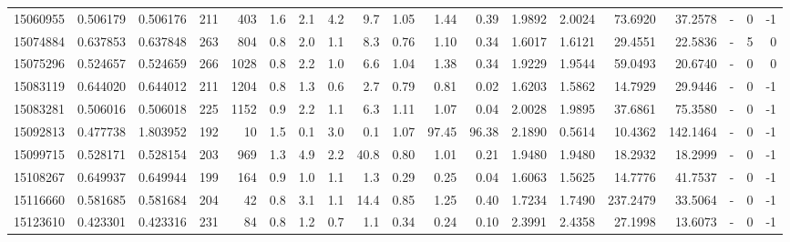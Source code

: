 \begin{tabular}{rrrrrrrrrrrrrrrrlrr}
  15060955 & 0.506179 &   0.506176 &  211 &  403 &      1.6 &      2.1 &     4.2 &      9.7 &       1.05 &        1.44 &        0.39 &  1.9892 &  2.0024 &   73.6920 &   37.2578 &             - &        0 &         -1 \\
  15074884 & 0.637853 &   0.637848 &  263 &  804 &      0.8 &      2.0 &     1.1 &      8.3 &       0.76 &        1.10 &        0.34 &  1.6017 &  1.6121 &   29.4551 &   22.5836 &             - &        5 &          0 \\
  15075296 & 0.524657 &   0.524659 &  266 & 1028 &      0.8 &      2.2 &     1.0 &      6.6 &       1.04 &        1.38 &        0.34 &  1.9229 &  1.9544 &   59.0493 &   20.6740 &             - &        0 &          0 \\
  15083119 & 0.644020 &   0.644012 &  211 & 1204 &      0.8 &      1.3 &     0.6 &      2.7 &       0.79 &        0.81 &        0.02 &  1.6203 &  1.5862 &   14.7929 &   29.9446 &             - &        0 &         -1 \\
  15083281 & 0.506016 &   0.506018 &  225 & 1152 &      0.9 &      2.2 &     1.1 &      6.3 &       1.11 &        1.07 &        0.04 &  2.0028 &  1.9895 &   37.6861 &   75.3580 &             - &        0 &         -1 \\
  15092813 & 0.477738 &   1.803952 &  192 &   10 &      1.5 &      0.1 &     3.0 &      0.1 &       1.07 &       97.45 &       96.38 &  2.1890 &  0.5614 &   10.4362 &  142.1464 &             - &        0 &         -1 \\
  15099715 & 0.528171 &   0.528154 &  203 &  969 &      1.3 &      4.9 &     2.2 &     40.8 &       0.80 &        1.01 &        0.21 &  1.9480 &  1.9480 &   18.2932 &   18.2999 &             - &        0 &         -1 \\
  15108267 & 0.649937 &   0.649944 &  199 &  164 &      0.9 &      1.0 &     1.1 &      1.3 &       0.29 &        0.25 &        0.04 &  1.6063 &  1.5625 &   14.7776 &   41.7537 &             - &        0 &         -1 \\
  15116660 & 0.581685 &   0.581684 &  204 &   42 &      0.8 &      3.1 &     1.1 &     14.4 &       0.85 &        1.25 &        0.40 &  1.7234 &  1.7490 &  237.2479 &   33.5064 &             - &        0 &         -1 \\
  15123610 & 0.423301 &   0.423316 &  231 &   84 &      0.8 &      1.2 &     0.7 &      1.1 &       0.34 &        0.24 &        0.10 &  2.3991 &  2.4358 &   27.1998 &   13.6073 &             - &        0 &         -1 \\

\end{tabular}
